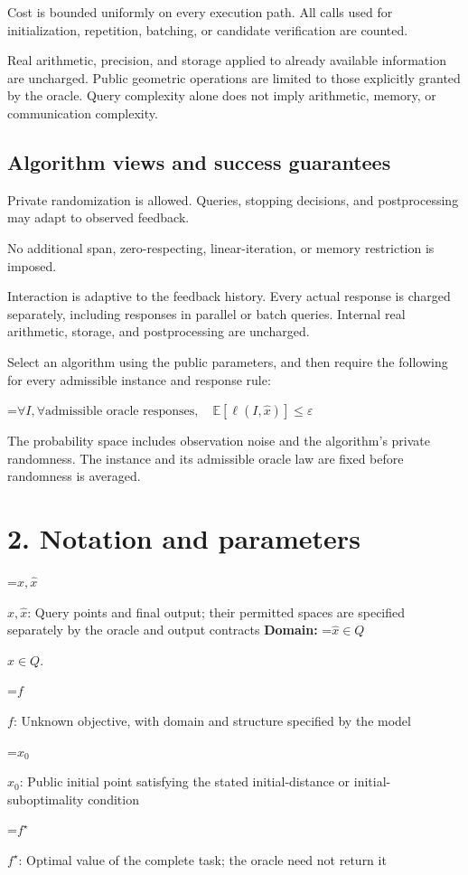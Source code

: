 \documentclass[10pt,a4paper]{article}
\newcommand{\AtlasMath}[1]{\par\begingroup\centering\setbox0=\hbox{$\displaystyle #1$}\ifdim\wd0>1.4\linewidth\typeout{ATLAS WIDE FORMULA: \the\wd0}\fi\ifdim\wd0>\linewidth\resizebox{\linewidth}{!}{\box0}\else\box0\fi\par\endgroup}
\newcommand{\AtlasInlineMath}[1]{\begingroup\setbox0=\hbox{$#1$}\ifdim\wd0>.4\linewidth\endgroup\AtlasMath{#1}\else\endgroup$#1$\fi}
\begin{document}
Cost is bounded uniformly on every execution path. All calls used for initialization, repetition, batching, or candidate verification are counted.

Real arithmetic, precision, and storage applied to already available information are uncharged. Public geometric operations are limited to those explicitly granted by the oracle. Query complexity alone does not imply arithmetic, memory, or communication complexity.

\subsection{Algorithm views and success guarantees}
Private randomization is allowed. Queries, stopping decisions, and postprocessing may adapt to observed feedback.

No additional span, zero-respecting, linear-iteration, or memory restriction is imposed.

Interaction is adaptive to the feedback history. Every actual response is charged separately, including responses in parallel or batch queries. Internal real arithmetic, storage, and postprocessing are uncharged.

Select an algorithm using the public parameters, and then require the following for every admissible instance and response rule:


\AtlasMath{\forall I,\forall\text{admissible oracle responses},\quad\mathbb{E}[\ell(I,\widehat{x})]\le\varepsilon}


The probability space includes observation noise and the algorithm's private randomness. The instance and its admissible oracle law are fixed before randomness is averaged.

\section{2. Notation and parameters}
\AtlasInlineMath{x,\widehat{x}}: Query points and final output; their permitted spaces are specified separately by the oracle and output contracts \textbf{Domain:} \AtlasInlineMath{\widehat{x}\in Q}.

\AtlasInlineMath{f}: Unknown objective, with domain and structure specified by the model

\AtlasInlineMath{x_0}: Public initial point satisfying the stated initial-distance or initial-suboptimality condition

\AtlasInlineMath{f^\star}: Optimal value of the complete task; the oracle need not return it
\end{document}
